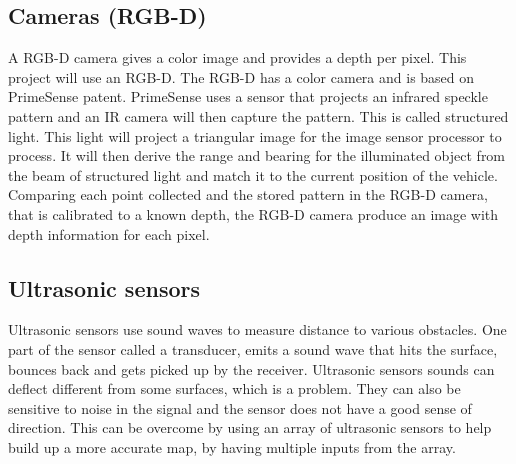 \subsection{Cameras (RGB-D)} \label{ch:CameraRGB}
A RGB-D camera gives a color image and provides a depth per pixel. This project will use an RGB-D.
The RGB-D has a color camera and is based on PrimeSense patent.  
PrimeSense uses a sensor that projects an infrared speckle pattern and an IR camera will then capture the pattern. This is called structured light. This light will project a triangular image for the image sensor processor to process. It will then derive the range and bearing for the illuminated object from the beam of structured light and match it to the current position of the vehicle\cite{Lasers}.\\
Comparing each point collected and the stored pattern in the RGB-D camera, that is calibrated to a known depth, the RGB-D camera produce an image with depth information for each pixel\cite{RGB-D-new}.

\subsection{Ultrasonic sensors}
Ultrasonic sensors use sound waves to measure distance to various obstacles. One part of the sensor called a transducer, emits a sound wave that hits the surface, bounces back and gets picked up by the receiver. 
Ultrasonic sensors sounds can deflect different from some surfaces, which is a problem. They can also be sensitive to noise in the signal and the sensor does not have a good sense of direction. This can be overcome by using an array of ultrasonic sensors to help build up a more accurate map, by having multiple inputs from the array\cite{Ultrasonicsnesor}.

